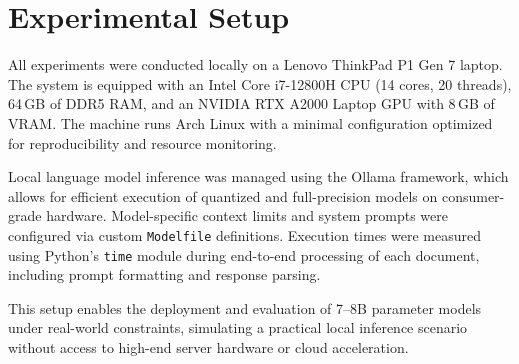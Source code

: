 \section{Experimental Setup}

All experiments were conducted locally on a Lenovo ThinkPad P1 Gen 7 laptop. The system is equipped with an Intel Core i7-12800H CPU (14 cores, 20 threads), 64\,GB of DDR5 RAM, and an NVIDIA RTX A2000 Laptop GPU with 8\,GB of VRAM. The machine runs Arch Linux with a minimal configuration optimized for reproducibility and resource monitoring.

Local language model inference was managed using the Ollama framework, which allows for efficient execution of quantized and full-precision models on consumer-grade hardware. Model-specific context limits and system prompts were configured via custom \texttt{Modelfile} definitions. Execution times were measured using Python’s \texttt{time} module during end-to-end processing of each document, including prompt formatting and response parsing.

This setup enables the deployment and evaluation of 7--8B parameter models under real-world constraints, simulating a practical local inference scenario without access to high-end server hardware or cloud acceleration.

\clearpage
